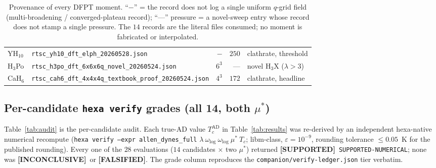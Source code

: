 \documentclass[11pt,a4paper]{article}
\providecommand{\tierGreen}{\textcolor{green!50!black}{\textbf{[SUPPORTED]}}}
\providecommand{\tierOrange}{\textcolor{orange!85!black}{\textbf{[INCONCLUSIVE]}}}
\providecommand{\tierRed}{\textcolor{red!75!black}{\textbf{[FALSIFIED]}}}
\begin{document}
\begin{table}[h]
\begin{tabular}{llrrl}
YH$_{10}$ & \texttt{rtsc\_yh10\_dft\_elph\_20260528.json}             & $-$ & $250$ & clathrate, threshold \\
H$_3$Po   & \texttt{rtsc\_h3po\_dft\_6x6x6q\_novel\_20260524.json}    & $6^3$ & ---     & novel H$_3$X ($\lambda{>}3$) \\
CaH$_6$   & \texttt{rtsc\_cah6\_dft\_4x4x4q\_textbook\_proof\_20260524.json} & $4^3$ & $172$ & clathrate, headline \\
\bottomrule
\end{tabular}
\caption{Provenance of every DFPT moment. ``$-$'' = the record does not log a
single uniform $q$-grid field (multi-broadening / converged-plateau record);
``---'' pressure = a novel-sweep entry whose record does not stamp a single
pressure. The $14$ records are the literal files consumed; no moment is
fabricated or interpolated.}
\label{tab:provenance}
\end{table}

\subsection{Per-candidate \texttt{hexa verify} grades (all 14, both $\mu^*$)}
\label{app:grades}

Table~\ref{tab:audit} is the per-candidate audit. Each true-AD value
$T_c^{\mathrm{AD}}$ in Table~\ref{tab:results} was re-derived by an independent
hexa-native numerical recompute (\texttt{hexa verify --expr allen\_dynes\_full}
$\lambda\ \omega_{\log}\ \omega_{\log}\ \mu^*\ T_c$; libm-class,
$\varepsilon=10^{-9}$, rounding tolerance $\le 0.05$~K for the published
rounding). Every one of the $28$ evaluations ($14$ candidates $\times$ two
$\mu^*$) returned \tierGreen\ \texttt{SUPPORTED-NUMERICAL}; none was
\tierOrange\ or \tierRed. The grade column reproduces the
\texttt{companion/verify-ledger.json} tier verbatim.
\end{document}
